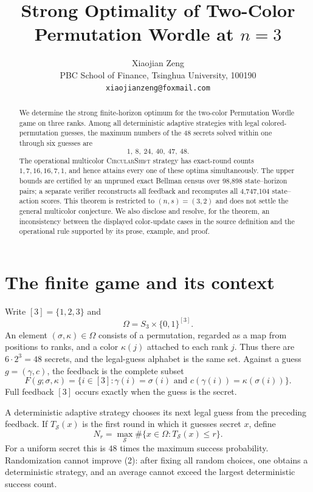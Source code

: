 \documentclass[11pt]{article}
\title{Strong Optimality of Two-Color Permutation Wordle at $n=3$}
\author{Xiaojian Zeng\\
  \small PBC School of Finance, Tsinghua University, 100190\\
  \small \texttt{xiaojianzeng@foxmail.com}}
\date{}
\newcommand{\bits}{\{0,1\}}
\newcommand{\Om}{\Omega}
\begin{document}
\maketitle

\begin{abstract}
We determine the strong finite-horizon optimum for the two-color Permutation
Wordle game on three ranks.  Among all deterministic adaptive strategies with
legal colored-permutation guesses, the maximum numbers of the 48 secrets solved
within one through six guesses are
\[
  1,\ 8,\ 24,\ 40,\ 47,\ 48.
\]
The operational multicolor \textsc{CircularShift} strategy has exact-round
counts $1,7,16,16,7,1$, and hence attains every one of these optima
simultaneously.  The upper bounds are certified by an unpruned exact Bellman
census over 98,898 state--horizon pairs; a separate verifier reconstructs all
feedback and recomputes all 4,747,104 state--action scores.  This theorem is
restricted to $(n,s)=(3,2)$ and does not settle the general multicolor
conjecture.  We also disclose and resolve, for the theorem, an inconsistency
between the displayed color-update cases in the source definition and the
operational rule supported by its prose, example, and proof.
\end{abstract}

\section{The finite game and its context}

Write $[3]=\{1,2,3\}$ and
\[
  \Om=S_3\times\bits^{[3]}.
\]
An element $(\sigma,\kappa)\in\Om$ consists of a permutation, regarded as a
map from positions to ranks, and a color $\kappa(j)$ attached to each rank
$j$.  Thus there are $6\cdot 2^3=48$ secrets, and the legal-guess alphabet is
the same set.  Against a guess $g=(\gamma,c)$, the feedback is the complete
subset
\[
 F(g;\sigma,\kappa)=
 \{i\in[3]:\gamma(i)=\sigma(i)\text{ and }
 c(\gamma(i))=\kappa(\sigma(i))\}.
 \tag{1}
\]
Full feedback $[3]$ occurs exactly when the guess is the secret.

A deterministic adaptive strategy chooses its next legal guess from the
preceding feedback.  If $T_{\mathcal S}(x)$ is the first round in which it
guesses secret $x$, define
\[
 N_r=\max_{\mathcal S}\#\{x\in\Om:T_{\mathcal S}(x)\le r\}.
 \tag{2}
\]
For a uniform secret this is $48$ times the maximum success probability.
Randomization cannot improve (2): after fixing all random choices, one obtains
a deterministic strategy, and an average cannot exceed the largest
deterministic success count.
\end{document}
